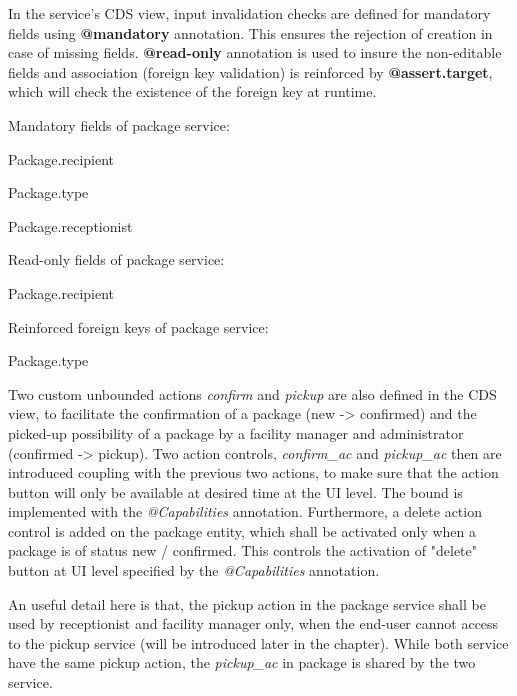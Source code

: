 \bigskip
In the service's CDS view, input invalidation checks are defined for mandatory fields using \textbf{@mandatory} annotation. This ensures the rejection of creation in case of missing fields. \textbf{@read-only} annotation is used to insure the non-editable fields and association (foreign key validation) is reinforced by \textbf{@assert.target}, which will check the existence of the foreign key at runtime.

\bigskip
Mandatory fields of package service:
\begin{compactenum}
	\item Package.recipient
    \item Package.type
    \item Package.receptionist
\end{compactenum}

\bigskip
Read-only fields of package service:
\begin{compactenum}
	\item Package.recipient
\end{compactenum}

\bigskip
Reinforced foreign keys of package service:
\begin{compactenum}
	\item Package.type
\end{compactenum}

\bigskip
Two custom unbounded actions \textit{confirm} and \textit{pickup} are also defined in the CDS view, to facilitate the confirmation of a package (new -> confirmed) and the picked-up possibility of a package by a facility manager and administrator (confirmed -> pickup). Two action controls, \textit{confirm\_ac} and \textit{pickup\_ac} then are introduced coupling with the previous two actions, to make sure that the action button will only be available at desired time at the UI level. The bound is implemented with the \textit{@Capabilities} annotation. Furthermore, a delete action control is added on the package entity, which shall be activated only when a package is of status new / confirmed. This controls the activation of "delete" button at UI level specified by the \textit{@Capabilities} annotation. 

\bigskip
An useful detail here is that, the pickup action in the package service shall be used by receptionist and facility manager only, when the end-user cannot access to the pickup service (will be introduced later in the chapter). While both service have the same pickup action, the \textit{pickup\_ac} in package is shared by the two service.

